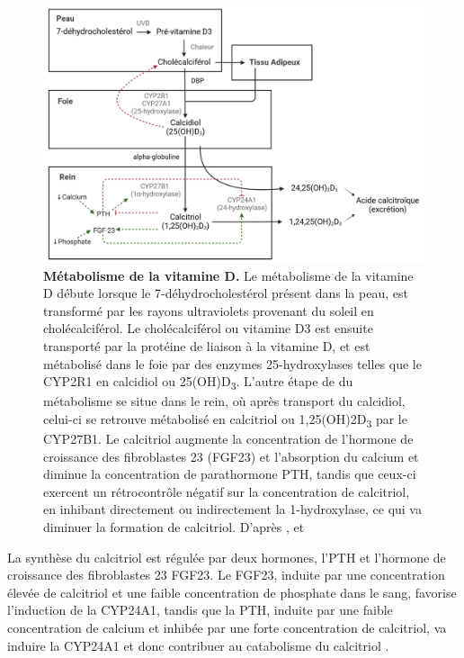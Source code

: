 \documentclass[
  a4paper,
  DIV=11,
  numbers=noendperiod,
  listof=totoc]{scrreprt}
\begin{document}
\begin{figure}

{\centering \includegraphics{figures/vitd-metabolism-fr.png}

}

\caption[\textbf{Métabolisme de la vitamine
D.}]{\label{fig-vitd-metabolism}\textbf{Métabolisme de la vitamine D.}
Le métabolisme de la vitamine D débute lorsque le 7-déhydrocholestérol
présent dans la peau, est transformé par les rayons ultraviolets
provenant du soleil en cholécalciférol. Le cholécalciférol ou vitamine
D3 est ensuite transporté par la protéine de liaison à la vitamine D, et
est métabolisé dans le foie par des enzymes 25-hydroxylases telles que
le CYP2R1 en calcidiol ou 25(OH)D\textsubscript{3}. L'autre étape de du
métabolisme se situe dans le rein, où après transport du calcidiol,
celui-ci se retrouve métabolisé en calcitriol ou
1,25(OH)2D\textsubscript{3} par le CYP27B1. Le calcitriol augmente la
concentration de l'hormone de croissance des fibroblastes 23 (FGF23) et
l'absorption du calcium et diminue la concentration de parathormone PTH,
tandis que ceux-ci exercent un rétrocontrôle négatif sur la
concentration de calcitriol, en inhibant directement ou indirectement la
1-hydroxylase, ce qui va diminuer la formation de calcitriol. D'après
\textcite{Christakos.2010}, \textcite{Tsiaras.2011} et
\textcite{Dankers.2017}}

\end{figure}

La synthèse du calcitriol est régulée par deux hormones, l'\ac{PTH} et
l'hormone de croissance des fibroblastes 23 \acs{FGF23}. Le \ac{FGF23},
induite par une concentration élevée de calcitriol et une faible
concentration de phosphate dans le sang, favorise l'induction de la
\ac{CYP24A1}, tandis que la \ac{PTH}, induite par une faible
concentration de calcium et inhibée par une forte concentration de
calcitriol, va induire la \ac{CYP24A1} et donc contribuer au catabolisme
du calcitriol \autocite{Dankers.2017,Christakos.2010}.
\end{document}
